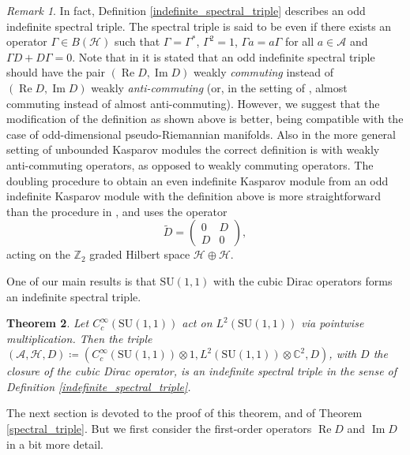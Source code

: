 \documentclass{amsart}
\newtheorem{theorem}{Theorem}[section]
\theoremstyle{definition}
\theoremstyle{remark}
\newtheorem{remark}[theorem]{Remark}
\DeclareMathOperator{\Ree}{Re}
\DeclareMathOperator{\Imm}{Im}
\numberwithin{equation}{section}
\begin{document}
\begin{remark}
    In fact, Definition \ref{indefinite_spectral_triple} describes an odd indefinite spectral triple. The spectral triple is said to be even if there exists an operator $\Gamma\in B(\mathcal{H})$ such that $\Gamma=\Gamma^*$, $\Gamma^2=1$, $\Gamma a=a\Gamma$ for all $a\in\mathcal{A}$ and $\Gamma D+D\Gamma=0$. Note that in \cite{dungen_rennie_2016} it is stated that an odd indefinite spectral triple should have the pair $(\Ree D,\Imm D)$ weakly \emph{commuting} instead of $(\Ree D,\Imm D)$ weakly \emph{anti-commuting} (or, in the setting of \cite{dungen_rennie_2016}, almost commuting instead of almost anti-commuting). However, we suggest that the modification of the definition as shown above is better, being compatible with the case of odd-dimensional pseudo-Riemannian manifolds. Also in the more general setting of unbounded Kasparov modules the correct definition is with weakly anti-commuting operators, as opposed to weakly commuting operators. The doubling procedure to obtain an even indefinite Kasparov module from an odd indefinite Kasparov module with the definition above is more straightforward than the procedure in \cite{dungen_rennie_2016}, and uses the operator
    \begin{equation*}
        \widetilde{D}=\begin{pmatrix}
            0 & D \\
            D & 0
        \end{pmatrix},
    \end{equation*}
    acting on the $\mathbb{Z}_2$ graded Hilbert space $\mathcal{H}\oplus\mathcal{H}$.
\end{remark}

One of our main results is that $\mathrm{SU}(1,1)$ with the cubic Dirac operators forms an indefinite spectral triple.

\begin{theorem}\label{spectral_triple_2}
    Let $C_c^\infty(\mathrm{SU}(1,1))$ act on $L^2(\mathrm{SU}(1,1))$ via pointwise multiplication. Then the triple $(\mathcal{A},\mathcal{H},D)\coloneq(C^\infty_c(\mathrm{SU}(1,1))\otimes 1,L^2(\mathrm{SU}(1,1))\otimes\mathbb{C}^2,D)$, with $D$ the closure of the cubic Dirac operator, is an indefinite spectral triple in the sense of Definition \ref{indefinite_spectral_triple}.
\end{theorem}
The next section is devoted to the proof of this theorem, and of Theorem \ref{spectral_triple}. But we first consider the first-order operators $\Ree D$ and $\Imm D$ in a bit more detail.
\end{document}
